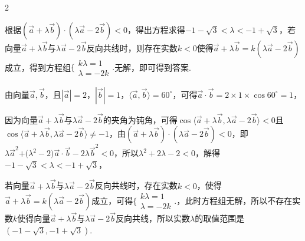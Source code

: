 \begin{multicols}{2}

\bindp [分析]根据\(( \overrightarrow{a} + \lambda\overrightarrow{b} ) \cdot ( \lambda\overrightarrow{a} - 2\overrightarrow{b} ) < 0\)，得出方程求得\(- 1 - \sqrt{3} < \lambda < - 1 + \sqrt{3}\)，若向量\(\overrightarrow{a} + \lambda\overrightarrow{b}\)与\(\lambda\overrightarrow{a} - 2\overrightarrow{b}\)反向共线时，则存在实数\(k < 0\)使得\(\overrightarrow{a} + \lambda\overrightarrow{b} = k(\lambda\overrightarrow{a} - 2\overrightarrow{b})\)成立，得到方程组\(\Bigg\{ \begin{array}{r}
k\lambda = 1 \\
\lambda = - 2k
\end{array} \Bigg.\)无解，即可得到答案.

\bindp [详解]由向量\(\overrightarrow{a},\overrightarrow{b}\)，且\(| \overrightarrow{a} | = 2\)，\(| \overrightarrow{b} | = 1\)，\(\langle \overrightarrow{a},\overrightarrow{b} \rangle = 60^{\circ}\)，可得\(\overrightarrow{a} \cdot \overrightarrow{b} = 2 \times 1 \times \cos 60^{\circ} = 1\)，

\bindp 因为向量\(\overrightarrow{a} + \lambda\overrightarrow{b}\)与\(\lambda\overrightarrow{a} - 2\overrightarrow{b}\)的夹角为钝角，可得\(\cos\langle \overrightarrow{a} + \lambda\overrightarrow{b},\lambda\overrightarrow{a} - 2\overrightarrow{b} \rangle < 0\)且\(\cos\langle \overrightarrow{a} + \lambda\overrightarrow{b},\lambda\overrightarrow{a} - 2\overrightarrow{b} \rangle \neq - 1\)，由\(( \overrightarrow{a} + \lambda\overrightarrow{b} ) \cdot ( \lambda\overrightarrow{a} - 2\overrightarrow{b} ) < 0\)，即\(\lambda{\overrightarrow{a}}^{2}\text{+(}\lambda^{2} - 2)\overrightarrow{a} \cdot \overrightarrow{b} - 2\lambda{\overrightarrow{b}}^{2} < 0\)，所以\(\lambda^{2} + 2\lambda - 2 < 0\)，解得\(- 1 - \sqrt{3} < \lambda < - 1 + \sqrt{3}\)，

\bindp 若向量\(\overrightarrow{a} + \lambda\overrightarrow{b}\)与\(\lambda\overrightarrow{a} - 2\overrightarrow{b}\)反向共线时，存在实数\(k < 0\)，使得\(\overrightarrow{a} + \lambda\overrightarrow{b} = k(\lambda\overrightarrow{a} - 2\overrightarrow{b})\)成立，可得\(\Bigg\{ \begin{array}{r}
k\lambda = 1 \\
\lambda = - 2k
\end{array} \Bigg.\)，此时方程组无解，所以不存在实数\(k\)使得向量\(\overrightarrow{a} + \lambda\overrightarrow{b}\)与\(\lambda\overrightarrow{a} - 2\overrightarrow{b}\)反向共线，所以实数\(\lambda\)的取值范围是\(( - 1 - \sqrt{3}, - 1 + \sqrt{3} )\).


\end{multicols}
